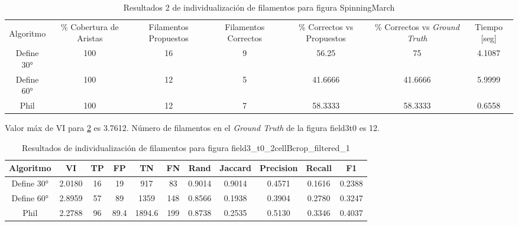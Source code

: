 \begin{table}[h]
    \centering
    \begin{tabular}{|c|c|c|c|c|c|c|}
    \hline
         & \multirow{4}{2cm}{\centering \% Cobertura de Aristas} & \multirow{4}{2cm}{Filamentos Propuestos} & \multirow{4}{2cm}{Filamentos Correctos} & \multirow{4}{2.5cm}{\% Correctos vs Propuestos} & \multirow{4}{2.5cm}{\centering \% Correctos vs {\it Ground Truth}} & \multirow{4}{1.2cm}{\centering Tiempo [seg]} \\
         &  &  &  & & &  \\
        Algoritmo &  &  &  & & &  \\
        &  &  &  & & &  \\ \hline
        Define 30° & 100 & 16 & 9 & 56.25       & 75          & 4.1087 \\
        Define 60° & 100 & 12 & 5 & 41.6666 & 41.6666 & 5.9999 \\ 
        Phil & 100 & 12 & 7 & 58.3333 & 58.3333 & 0.6558 \\
        \hline
    \end{tabular}
    \caption{Resultados 2 de individualizaci\'on de filamentos para figura SpinningMarch}
    \label{tab:SpinningMarchantiaResults2}
\end{table}



Valor m\'ax de VI para \ref{tab:field3t0filtered1} es 3.7612.
N\'umero de filamentos en el {\it Ground Truth} de la figura field3t0 es 12.


\begin{table}[h]
    \centering
    \begin{tabular}{|c|c|c|c|c|c|c|c|c|c|c|}
    \hline
        Algoritmo & VI & TP & FP &TN &FN & Rand	& Jaccard &	Precision &	Recall &	F1 \\ \hline
        Define 30° & 2.0180 & 16 & 19 & 917 & 83 & 0.9014 & 0.9014 & 0.4571 & 0.1616 & 0.2388\\
        Define 60° &  2.8959 & 57 & 89 & 1359 & 148 & 0.8566 & 0.1938 & 0.3904 & 0.2780 & 0.3247\\ 
        Phil & 2.2788 & 96 & 89.4 & 1894.6 & 199 & 0.8738 & 0.2535 & 0.5130 & 0.3346 & 0.4037 \\
        \hline
    \end{tabular}
    \caption{Resultados de individualizaci\'on de filamentos para figura field3_t0_2cellBcrop_filtered_1}
    \label{tab:field3t0filtered1}
\end{table}

